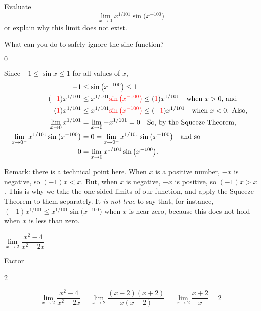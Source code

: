 \begin{question}[2006H]
 Evaluate
$$
\lim_{x\rightarrow 0} x^{1/101} \sin\big(x^{-100}\big)
$$
or explain why this limit does not exist.
\end{question}
\begin{hint}
What can you do to safely ignore the sine function?
\end{hint}
\begin{answer}
$0$
\end{answer}
\begin{solution}
Since $-1 \leq \sin x \leq 1$ for all values of $x$,
\begin{align*}
{-1}&\leq  \sin\big(x^{-100}\big)\leq1\\
( \textcolor{red}{-1})x^{1/101}
             &\leq x^{1/101}\textcolor{red}{\sin\big(x^{-100}\big)}
             \leq(\textcolor{red}{1})x^{1/101}
~~~\mbox{when $x >0$, and }\\
( \textcolor{red}{1})x^{1/101}
          &\leq x^{1/101}\textcolor{red}{\sin\big(x^{-100}\big)}
           \leq (\textcolor{red}{-1})x^{1/101}
~~~\mbox{when $x <0$. Also, }\\
\lim_{x \to 0}x^{1/101}&=\lim_{x \to 0}-x^{1/101}=0
~~~\mbox{So, by the Squeeze Theorem,}\\
\lim_{x \to 0^-}x^{1/101} \sin\big(x^{-100}\big)&=0=\lim_{x \to 0^+}x^{1/101} \sin\big(x^{-100}\big)~~~\mbox{and so}\\
0&=\lim_{x\rightarrow 0} x^{1/101} \sin\big(x^{-100}\big).
\end{align*}

Remark: there is a  technical point here. When $x$ is a positive number, $-x$ is negative, so $(-1)x<x$. But, when $x$ is negative, $-x$ is positive, so $(-1)x>x$. This is why we take the one-sided limits of our function, and apply the Squeeze Theorem to them separately. It \emph{is not true} to say that, for instance, $(-1)x^{1/101} \leq  x^{1/101} \sin\big(x^{-100}\big)$ when $x$ is near zero, because this does not hold when $x$ is less than zero.
\end{solution}



\begin{question}[1999H]
$\lim\limits_{x\rightarrow2}\dfrac{x^2-4}{x^2-2x}$
\end{question}
\begin{hint} Factor
\end{hint}
\begin{answer} 2
\end{answer}
\begin{solution}
$$
\lim_{x\rightarrow2}\frac{x^2-4}{x^2-2x}
=\lim_{x\rightarrow2}\frac{(x-2)(x+2)}{x(x-2)}
=\lim_{x\rightarrow2}\frac{x+2}{x}
={2}
$$
\end{solution}



